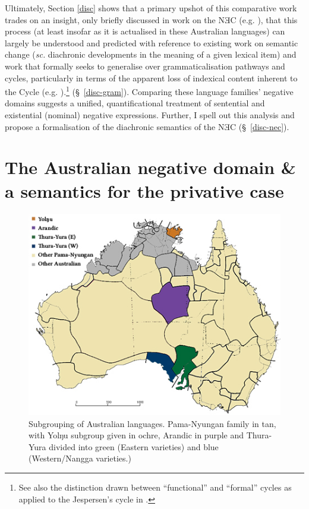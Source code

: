 Ultimately, Section \ref{disc} shows that a primary upshot of this comparative work trades on an insight, only briefly discussed in work on the NƎC (e.g. \citealt[17]{Croft1991}), that this process (at least insofar as it is actualised in these Australian languages) can largely be understood and predicted with reference to existing work on semantic change (\textit{sc.} diachronic developments in the meaning of a given lexical item) and work that formally seeks to generalise over grammaticalisation pathways and cycles, particularly in terms of the apparent loss of indexical content inherent to the Cycle (e.g. \citealt{Deo2015,Deo2015a,Deo2017a}).\footnote{See also the distinction drawn between ``functional'' and ``formal'' cycles as applied to the Jespersen's cycle in \citet{Ahern}.} (\S~\ref{disc-gram}).  Comparing these language families' negative domains suggests a unified, quantificational treatment of sentential and existential (nominal) negative expressions. Further, I spell out this analysis and propose a formalisation of the diachronic semantics of the NƎC (\S~\ref{disc-nec}).

\section{The Australian negative domain \& a semantics for the privative case}\label{typ-sec}
\begin{figure}\centering
	\includegraphics[scale=.7]{YolTYAr-leg.jpg}
	\caption[\textsc{map.} Pama-Nyungan subgroups investigated in Part \ref{NEC}]{Subgrouping of Australian languages. Pama-Nyungan family in tan, with Yolŋu subgroup given in ochre, Arandic in purple and Thura-Yura divided into green (Eastern varieties) and blue (Western/Nangga varieties.)}\label{Map}
\end{figure}

